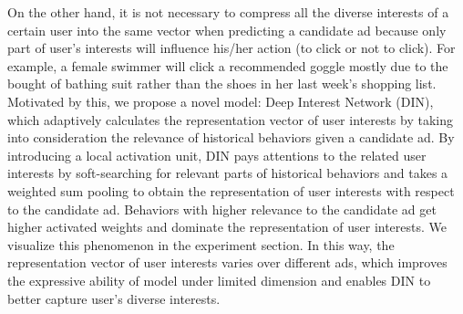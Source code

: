 On the other hand, it is not necessary to compress all the diverse interests of a certain user into the same vector when predicting a candidate ad because only part of user's interests will influence his/her action (to click or not to click). For example, a female swimmer will click a recommended goggle mostly due to the bought of bathing suit rather than the shoes in her last week's shopping list. 
Motivated by this, we propose a novel model: Deep Interest Network (DIN), which adaptively calculates the representation vector of user interests by taking into consideration the relevance of historical behaviors given a candidate ad. 
By introducing a local activation unit, DIN pays attentions to the related user interests by soft-searching for relevant parts of historical behaviors and takes a weighted sum pooling to obtain the representation of user interests with respect to the candidate ad.  
Behaviors with higher relevance to the candidate ad get higher activated weights and dominate the representation of user interests. 
We visualize this phenomenon in the experiment section. 
In this way, the representation vector of user interests varies over different ads, which improves the expressive ability of model under limited dimension and enables DIN to better capture user's diverse interests.


